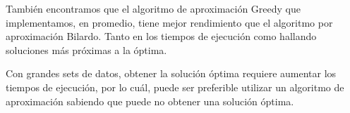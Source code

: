 \documentclass{estilo}
\begin{document}
También encontramos que el algoritmo de aproximación Greedy que implementamos, en promedio, tiene mejor rendimiento que el algoritmo por aproximación Bilardo. Tanto en los tiempos de ejecución como hallando soluciones más próximas a la óptima.

Con grandes sets de datos, obtener la solución óptima requiere aumentar los tiempos de ejecución, por lo cuál, puede ser preferible utilizar un algoritmo de aproximación sabiendo que puede no obtener una solución óptima. 
\end{document}
